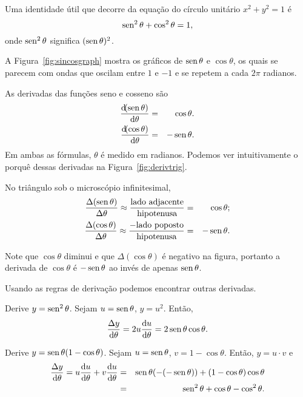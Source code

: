 Uma identidade útil que decorre da equação do círculo unitário
$x^2 + y^2 = 1$ é
$$
  \operatorname{sen}^2 \theta + \cos^2 \theta = 1,
$$
onde $\operatorname{sen}^2 \theta$ significa $(\operatorname{sen} \theta)^2$.

A Figura~\ref{fig:sincosgraph} mostra os gráficos de $\operatorname{sen} \theta$ e
$\cos \theta$, os quais se parecem com ondas que oscilam entre $1$ e $-1$
e se repetem a cada $2\pi$ radianos.


As derivadas das funções seno e cosseno são
\begin{eqnarray*}
  \frac{\dif(\sen \theta)}{\dif\theta} & = & \cos \theta. \\
  \frac{\dif(\cos \theta)}{\dif\theta} & = & -\sen \theta.
\end{eqnarray*}
Em ambas as fórmulas, $\theta$ é medido em radianos. Podemos ver
intuitivamente o porquê dessas derivadas na Figura~\ref{fig:derivtrig}.


No triângulo sob o microscópio infinitesimal,
\begin{eqnarray*}
  \frac{\Delta(\operatorname{sen} \theta)}{\Delta \theta} \approx
    \frac{\text{lado adjacente}}{\text{hipotenusa}} & = &
      \cos \theta; \\
  \frac{\Delta(\cos \theta)}{\Delta \theta} \approx
    \frac{-\text{lado poposto}}{\text{hipotenusa}} & = &
      -\operatorname{sen} \theta.
\end{eqnarray*}

Note que $\cos \theta$ diminui e que $\Delta(\cos \theta)$ é negativo na
figura, portanto a derivada de $\cos \theta$ é $-\operatorname{sen}\theta$ ao invés de
apenas $\operatorname{sen} \theta$.

Usando as regras de derivação podemos encontrar outras derivadas.

\begin{absolutelynopagebreak}
\begin{example}
Derive $y = \operatorname{sen}^2 \theta$. Sejam $u = \operatorname{sen}\theta$, $y = u^2$. Então,
$$
  \frac{\dy}{\dif\theta} = 2u \frac{\du}{\dif\theta} = 2\sen\theta\cos\theta.
$$
\end{example}
\end{absolutelynopagebreak}

\begin{example}
Derive $y = \operatorname{sen}\theta(1-\cos\theta)$. Sejam $u = \operatorname{sen}\theta$,
$v = 1-\cos\theta$. Então, $y = u \cdot v$ e
\begin{eqnarray*}
  \frac{\dy}{\dif\theta} = u \frac{\du}{\dif\theta} + v \frac{\du}{\dif\theta}
  & = & \sen\theta(-(-\sen\theta)) + (1-\cos\theta)\cos\theta \\
  & = & \sen^2\theta + \cos\theta - \cos^2\theta.
\end{eqnarray*}
\end{example}

